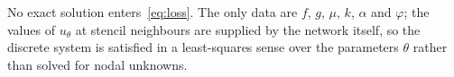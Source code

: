 No exact solution enters~\eqref{eq:loss}. The only data are $f$, $g$, $\mu$, $k$,
$\alpha$ and $\varphi$; the values of $u_{\theta}$ at stencil neighbours are supplied
by the network itself, so the discrete system is satisfied in a least-squares sense
over the parameters $\theta$ rather than solved for nodal unknowns.
